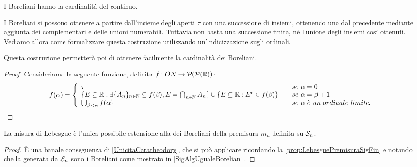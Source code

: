 \begin{proposition}\label{CardBoreliani}
	I Boreliani hanno la cardinalità del continuo.
\end{proposition}
\begin{remark}
	I Boreliani si possono ottenere a partire dall'insieme degli aperti $\tau$ con una successione di insiemi, ottenendo uno dal precedente
	mediante aggiunta dei complementari e delle unioni numerabili. Tuttavia non basta una successione finita, né l'unione degli insiemi
	così ottenuti. Vediamo allora come formalizzare questa costruzione utilizzando un'indicizzazione sugli ordinali.
	
	Questa costruzione permetterà poi di ottenere facilmente la cardinalità dei Boreliani.
\end{remark}
\begin{proof}
	Consideriamo la seguente funzione, definita $f:ON \rightarrow \mathcal{P}(\mathcal{P}(\R))$:
	\[
	f(\alpha) = \left\{
		\begin{array}{ll}
			\tau & \quad se\ \alpha=0 \\
			\{ E\subseteq \R : \exists \{A_n\}_{n\in \N}\subseteq f(\beta), E = \bigcap_{n\in\N}A_n\}
			\cup\{E\subseteq\R : E^\mathsf{c}\in f(\beta)\} & \quad se\ \alpha=\beta+1\\
			\bigcup_{\beta < \alpha}f(\alpha) & \quad se\ \alpha\ \grave{e}\ un\ ordinale\ limite.
		\end{array}
	\right.
	\]

\end{proof}


\begin{proposition}\label{prop:LebesgueUnicaEstensione}
	La misura di Lebesgue è l'unica possibile estensione alla \sigalg{} dei Boreliani della premisura $m_n$ definita su $\S_n$.
\end{proposition}
\begin{proof}
	È una banale conseguenza di \cref{UnicitaCaratheodory}, che si può applicare ricordando la \cref{prop:LebesguePremisuraSigFin} e notando che la \sigalg{} generata da $\S_n$ sono i Boreliani come mostrato in \cref{SigAlgUgualeBoreliani}.
\end{proof}


